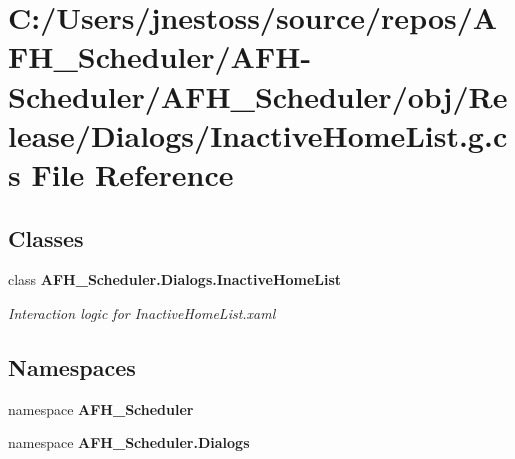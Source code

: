 \section{C\+:/\+Users/jnestoss/source/repos/\+A\+F\+H\+\_\+\+Scheduler/\+A\+F\+H-\/\+Scheduler/\+A\+F\+H\+\_\+\+Scheduler/obj/\+Release/\+Dialogs/\+Inactive\+Home\+List.g.\+cs File Reference}
\label{_release_2_dialogs_2_inactive_home_list_8g_8cs}
\subsection*{Classes}
\begin{DoxyCompactItemize}
\item 
class \textbf{ A\+F\+H\+\_\+\+Scheduler.\+Dialogs.\+Inactive\+Home\+List}
\begin{DoxyCompactList}\small\item\em Interaction logic for Inactive\+Home\+List.\+xaml \end{DoxyCompactList}\end{DoxyCompactItemize}
\subsection*{Namespaces}
\begin{DoxyCompactItemize}
\item 
namespace \textbf{ A\+F\+H\+\_\+\+Scheduler}
\item 
namespace \textbf{ A\+F\+H\+\_\+\+Scheduler.\+Dialogs}
\end{DoxyCompactItemize}
